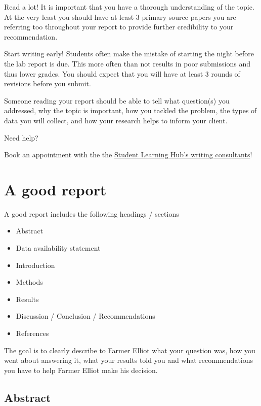 \documentclass[
]{book}
\providecommand{\tightlist}{%
  \setlength{\itemsep}{0pt}\setlength{\parskip}{0pt}}
\begin{document}
Read a lot! It is important that you have a thorough understanding of the topic. At the very least you should have at least 3 primary source papers you are referring too throughout your report to provide further credibility to your recommendation.

Start writing early! Students often make the mistake of starting the night before the lab report is due. This more often than not results in poor submissions and thus lower grades. You should expect that you will have at least 3 rounds of revisions before you submit.

Someone reading your report should be able to tell what question(s) you addressed, why the topic is important, how you tackled the problem, the types of data you will collect, and how your research helps to inform your client.

Need help?

Book an appointment with the the \href{https://students.ok.ubc.ca/academic-success/learning-hub/writing-language/}{Student Learning Hub's writing consultants}!

\hypertarget{a-good-report}{%
\section*{A good report}\label{a-good-report}}

A good report includes the following headings / sections

\begin{itemize}
\tightlist
\item
  Abstract
\item
  Data availability statement
\item
  Introduction
\item
  Methods
\item
  Results
\item
  Discussion / Conclusion / Recommendations
\item
  References
\end{itemize}

The goal is to clearly describe to Farmer Elliot what your question was, how you went about answering it, what your results told you and what recommendations you have to help Farmer Elliot make his decision.

\hypertarget{abstract}{%
\subsection*{Abstract}\label{abstract}}
\end{document}
